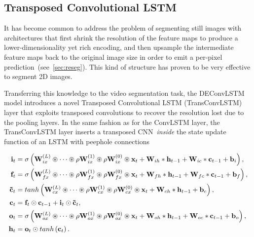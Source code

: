 \subsection{Transposed Convolutional LSTM}

It has become common to address the problem of segmenting still images with
architectures that first shrink the resolution of the feature maps to produce a
lower-dimensionality yet rich encoding, and then upsample the intermediate
feature maps back to the original image size in order to emit a per-pixel
prediction~(see~\autoref{sec:reseg}). This kind of structure has proven to be
very effective to segment 2D images.

Transferring this knowledge to the video segmentation task, the DEConvLSTM
model introduces a novel Transposed Convolutional LSTM (TransConvLSTM) layer
that exploits transposed convolutions to recover the resolution lost due to the
pooling layers. In the same fashion as for the ConvLSTM layer, the
TransConvLSTM layer inserts a transposed CNN~\emph{inside} the state update
function of an LSTM with peephole connections

\begin{equation}\label{eq:deconvLSTM_dec}
\begin{split}
    \mathbf{i}_t &= \sigma\left(
        \mathbf{W}_{ix}^{(L)} \circledast \dots \circledast \rho
            \mathbf{W}_{ix}^{(1)} \circledast \rho \mathbf{W}_{ix}^{(0)}
            \circledast \mathbf{x}_t +
        \mathbf{W}_{ih} * \mathbf{h}_{t-1} +
        \mathbf{W}_{ic} * \mathbf{c}_{t-1} +
        \mathbf{b}_i \right),\\
    \mathbf{f}_t &= \sigma\left(
        \mathbf{W}_{fx}^{(L)} \circledast \dots \circledast \rho
            \mathbf{W}_{fx}^{(1)} \circledast \rho \mathbf{W}_{fx}^{(0)}
            \circledast \mathbf{x}_t +
        \mathbf{W}_{fh} * \mathbf{h}_{t-1} +
        \mathbf{W}_{fc} * \mathbf{c}_{t-1} +
        \mathbf{b}_f \right),\\
    \mathbf{\tilde c}_t &= tanh \left(
        \mathbf{W}_{cx}^{(L)} \circledast \dots \circledast \rho
            \mathbf{W}_{cx}^{(1)} \circledast \rho \mathbf{W}_{cx}^{(0)}
            \circledast \mathbf{x}_t +
        \mathbf{W}_{ch} * \mathbf{h}_{t-1} +
        \mathbf{b}_c \right),\\
    \mathbf{c}_t &= \mathbf{f}_t \odot \mathbf{c}_{t-1} + \mathbf{i}_t
        \odot \mathbf{\tilde c}_t,\\
    \mathbf{o}_t &= \sigma\left(
        \mathbf{W}_{ox}^{(L)} \circledast \dots \circledast \rho
            \mathbf{W}_{ox}^{(1)} \circledast \rho \mathbf{W}_{ox}^{(0)}
            \circledast \mathbf{x}_t +
        \mathbf{W}_{oh} * \mathbf{h}_{t-1} +
        \mathbf{W}_{oc} * \mathbf{c}_{t-1} +
        \mathbf{b}_o \right),\\
    \mathbf{h}_t &= \mathbf{o}_t \odot tanh \left(\mathbf{c}_t\right).
\end{split}
\end{equation}

